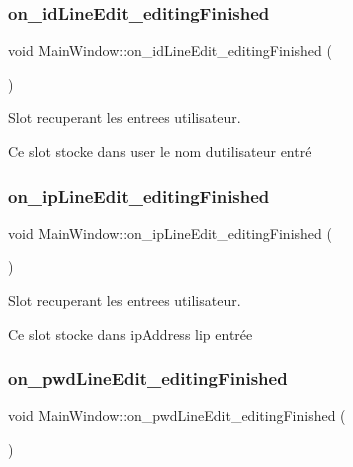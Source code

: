 \subsubsection{\texorpdfstring{on\+\_\+id\+Line\+Edit\+\_\+editing\+Finished}{on\_idLineEdit\_editingFinished}}
{\footnotesize\ttfamily void Main\+Window\+::on\+\_\+id\+Line\+Edit\+\_\+editing\+Finished (\begin{DoxyParamCaption}{ }\end{DoxyParamCaption})\hspace{0.3cm}{\ttfamily [slot]}}



Slot recuperant les entrees utilisateur. 

Ce slot stocke dans user le nom d\textquotesingle{}utilisateur entré \mbox{\label{classMainWindow_af61dc400b82ca1d28bab9fb4ee377528}} 
\subsubsection{\texorpdfstring{on\+\_\+ip\+Line\+Edit\+\_\+editing\+Finished}{on\_ipLineEdit\_editingFinished}}
{\footnotesize\ttfamily void Main\+Window\+::on\+\_\+ip\+Line\+Edit\+\_\+editing\+Finished (\begin{DoxyParamCaption}{ }\end{DoxyParamCaption})\hspace{0.3cm}{\ttfamily [slot]}}



Slot recuperant les entrees utilisateur. 

Ce slot stocke dans ip\+Address l\textquotesingle{}ip entrée \mbox{\label{classMainWindow_a1a1846c640e2e6e208455a85f2c47a04}} 
\subsubsection{\texorpdfstring{on\+\_\+pwd\+Line\+Edit\+\_\+editing\+Finished}{on\_pwdLineEdit\_editingFinished}}
{\footnotesize\ttfamily void Main\+Window\+::on\+\_\+pwd\+Line\+Edit\+\_\+editing\+Finished (\begin{DoxyParamCaption}{ }\end{DoxyParamCaption})\hspace{0.3cm}{\ttfamily [slot]}}




